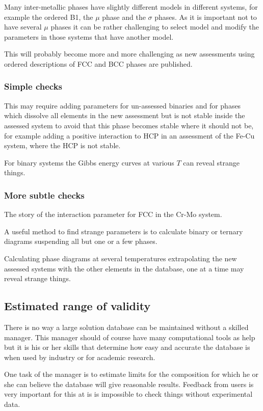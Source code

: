\documentclass[12pt]{article}
\begin{document}
Many inter-metallic phases have slightly different models in different
systems, for example the ordered B1, the $\mu$ phase and the $\sigma$
phases.  As it is important not to have several $\mu$ phases it can be
rather challenging to select model and modify the parameters in those
systems that have another model.

This will probably become more and more challenging as new assessments
using ordered descriptions of FCC and BCC phases are published.

\subsubsection{Simple checks}

This may require adding parameters for un-assessed binaries and for
phases which dissolve all elements in the new assessment but is not
stable inside the assessed system to avoid that this phase becomes
stable where it should not be, for example adding a positive
interaction to HCP in an assessment of the Fe-Cu system, where the HCP
is not stable.

For binary systems the Gibbs energy curves at various $T$ can reveal
strange things.

\subsubsection{More subtle checks}

The story of the interaction parameter for FCC in the Cr-Mo system.

A useful method to find strange parameters is to calculate binary or
ternary diagrams suspending all but one or a few phases.

Calculating phase diagrams at several temperatures extrapolating the
new assessed systems with the other elements in the database, one at a
time may reveal strange things.

\subsection{Estimated range of validity}

There is no way a large solution database can be maintained without a
skilled manager.  This manager should of course have many
computational tools as help but it is his or her skills that determine
how easy and accurate the database is when used by industry or for
academic research.

One task of the manager is to estimate limits for the composition for
which he or she can believe the database will give reasonable results.
Feedback from users is very important for this at is is impossible to
check things without experimental data.
\end{document}
